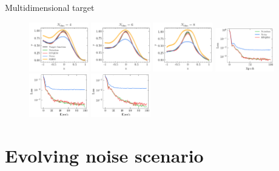 \documentclass[8pt, xcolor={svgnames}, hyperref={linkcolor=black}, aspectratio=169]{beamer}
\begin{document}
\begin{frame}{Multidimensional target}
\begin{figure}
    \includegraphics[width=0.23\textwidth]{figures/cos4d.pdf}%
    \includegraphics[width=0.23\textwidth]{figures/cos6d.pdf}%
    \includegraphics[width=0.23\textwidth]{figures/cos8d.pdf}
    \includegraphics[width=0.23\textwidth]{figures/cos4d_loss.pdf}%
    \includegraphics[width=0.23\textwidth]{figures/cos6d_loss.pdf}%
    \includegraphics[width=0.23\textwidth]{figures/cos8d_loss.pdf}
\end{figure}
\end{frame}

\section{Evolving noise scenario}
\end{document}
